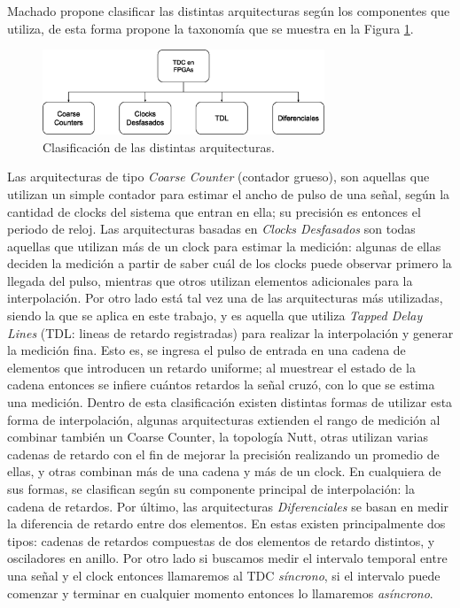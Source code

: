 Machado propone clasificar las distintas arquitecturas según los componentes que utiliza, de esta forma propone la taxonomía que
se muestra en la Figura \ref{fig: taxonomia}.
\begin{figure}[H]
     \centering
     \includegraphics[width=0.75\textwidth]{imagenes/taxonomia.eps}
     \caption{Clasificación de las distintas arquitecturas.}
     \label{fig: taxonomia}
\end{figure}
Las arquitecturas de tipo \textit{Coarse Counter} (contador grueso), son aquellas que utilizan un simple contador para estimar el
ancho de pulso de una señal, según la cantidad de clocks del sistema que entran en ella; su precisión es entonces el periodo de
reloj. Las arquitecturas basadas en \textit{Clocks Desfasados} son todas aquellas que utilizan más de un clock para estimar la medición:
algunas de ellas deciden la medición a partir de saber cuál de los clocks puede observar primero la llegada del pulso, mientras que
otros utilizan elementos adicionales para la interpolación. Por otro lado está
tal vez una de las arquitecturas más utilizadas, siendo la que se aplica en este trabajo, y es aquella que utiliza \textit{Tapped Delay Lines}
(TDL: lineas de retardo registradas) para realizar la interpolación y generar la medición fina. Esto es, se ingresa el pulso 
de entrada en una cadena de elementos que introducen un retardo uniforme; al muestrear el estado de la cadena entonces
se infiere cuántos retardos la señal cruzó, con lo que se estima una medición. Dentro de esta clasificación existen distintas formas
de utilizar esta forma de interpolación, algunas arquitecturas extienden el rango de medición al combinar también un Coarse Counter, la
topología Nutt, otras utilizan varias cadenas de retardo con el fin de mejorar la precisión realizando un promedio de ellas, y otras combinan
más de una cadena y más de un clock. En cualquiera de sus formas, se clasifican según su componente principal de interpolación:
la cadena de retardos. Por último, las arquitecturas \textit{Diferenciales} se basan en medir la diferencia de retardo entre dos elementos. En
estas existen principalmente dos tipos: cadenas de retardos compuestas de dos elementos de retardo distintos, y osciladores en anillo.
Por otro lado si buscamos medir el intervalo temporal entre una señal y el clock entonces llamaremos al TDC 
\textit{síncrono}, si el intervalo puede comenzar y terminar en cualquier momento entonces lo llamaremos 
\textit{asíncrono}.\\

